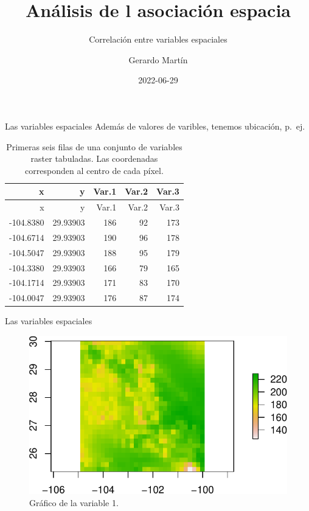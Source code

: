 \documentclass[
  11pt,
  ignorenonframetext,
]{beamer}
\title{Análisis de l asociación espacia}
\subtitle{Correlación entre variables espaciales}
\author{Gerardo Martín}
\date{2022-06-29}
\begin{document}
\frame{\titlepage}

\begin{frame}{Las variables espaciales}
\protect\hypertarget{las-variables-espaciales}{}
Además de valores de varibles, tenemos ubicación, p.~ej.

\begin{longtable}[]{@{}rrrrr@{}}
\caption{Primeras seis filas de una conjunto de variables raster
tabuladas. Las coordenadas corresponden al centro de cada
píxel.}\tabularnewline
\toprule()
x & y & Var.1 & Var.2 & Var.3 \\
\midrule()
\endfirsthead
\toprule()
x & y & Var.1 & Var.2 & Var.3 \\
\midrule()
\endhead
-104.8380 & 29.93903 & 186 & 92 & 173 \\
-104.6714 & 29.93903 & 190 & 96 & 178 \\
-104.5047 & 29.93903 & 188 & 95 & 179 \\
-104.3380 & 29.93903 & 166 & 79 & 165 \\
-104.1714 & 29.93903 & 171 & 83 & 170 \\
-104.0047 & 29.93903 & 176 & 87 & 174 \\
\bottomrule()
\end{longtable}
\end{frame}

\begin{frame}{Las variables espaciales}
\protect\hypertarget{las-variables-espaciales-1}{}
\begin{figure}

{\centering \includegraphics{Correlacion-espacial_files/figure-beamer/unnamed-chunk-2-1} 

}

\caption{Gráfico de la variable 1.}\label{fig:unnamed-chunk-2}
\end{figure}
\end{frame}
\end{document}
